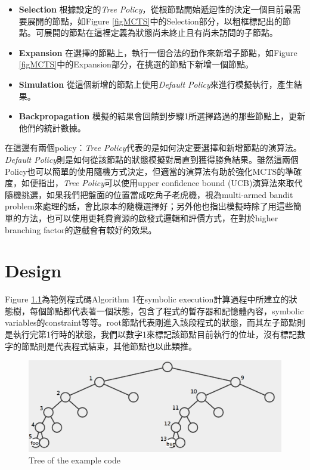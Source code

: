 \documentclass[12pt,a4paper,oneside]{book}
\begin{document}
\begin{itemize}
\item \textbf{Selection} 根據設定的\textit{Tree Policy}，從根節點開始遞迴性的決定一個目前最需要展開的節點，如Figure \ref{figMCTS}中的Selection部分，以粗框標記出的節點。可展開的節點在這裡定義為狀態尚未終止且有尚未訪問的子節點。
\item \textbf{Expansion} 在選擇的節點上，執行一個合法的動作來新增子節點，如Figure \ref{figMCTS}中的Expansion部分，在挑選的節點下新增一個節點。
\item \textbf{Simulation} 從這個新增的節點上使用\textit{Default Policy}來進行模擬執行，產生結果。
\item \textbf{Backpropagation} 模擬的結果會回饋到步驟1所選擇路過的那些節點上，更新他們的統計數據。
\end{itemize}

在這邊有兩個policy：\textit{Tree Policy}代表的是如何決定要選擇和新增節點的演算法。\textit{Default Policy}則是如何從該節點的狀態模擬對局直到獲得勝負結果。雖然這兩個Policy也可以簡單的使用隨機方式決定，但適當的演算法有助於強化MCTS的準確度，如\cite{Intro2MCTS}便指出，\textit{Tree Policy}可以使用upper confidence bound (UCB)演算法來取代隨機挑選，如果我們把盤面的位置當成吃角子老虎機，視為multi-armed bandit problem來處理的話，會比原本的隨機選擇好；另外他也指出模擬時除了用這些簡單的方法，也可以使用更耗費資源的啟發式邏輯和評價方式，在對於higher branching factor的遊戲會有較好的效果。

\chapter{Design}

Figure \ref{figTREE}為範例程式碼Algorithm 1在symbolic execution計算過程中所建立的狀態樹，每個節點都代表著一個狀態，包含了程式的暫存器和記憶體內容，symbolic variables的constraint等等。root節點代表剛進入該段程式的狀態，而其左子節點則是執行完第1行時的狀態，我們以數字1來標記該節點目前執行的位址，沒有標記數字的節點則是代表程式結束，其他節點也以此類推。

\begin{figure}[htbp]
\center
\includegraphics[width=\textwidth]{figures/tree.png}
\caption{Tree of the example code \label{figTREE}}
\end{figure}
\end{document}
